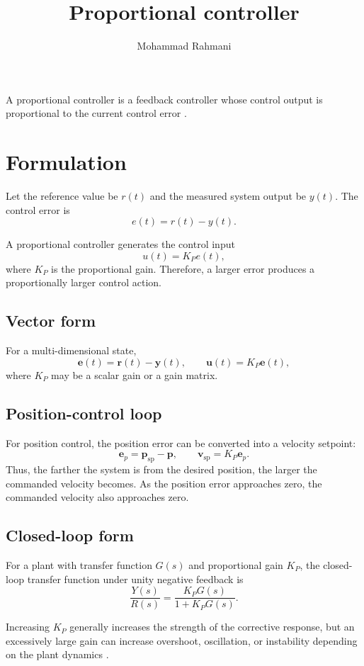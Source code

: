 \documentclass[a4paper]{article}
\title{Proportional controller}
\date{}
\author{Mohammad Rahmani}
\begin{document}
   \maketitle

   A proportional controller is a feedback controller whose control output is proportional to the current control error \cite{astrom-2008-feedback-systems-an-introduction-for-scientists-and-engineers}.

   \section{Formulation}
      Let the reference value be $r(t)$ and the measured system output be $y(t)$. The control error is
      \[
         e(t)=r(t)-y(t).
      \]

      A proportional controller generates the control input
      \[
         u(t)=K_P e(t),
      \]
      where $K_P$ is the proportional gain. Therefore, a larger error produces a proportionally larger control action.

   \subsection{Vector form}
      For a multi-dimensional state,
      \[
         \mathbf{e}(t)=\mathbf{r}(t)-\mathbf{y}(t),
         \qquad
         \mathbf{u}(t)=K_P\mathbf{e}(t),
      \]
      where $K_P$ may be a scalar gain or a gain matrix.

   \subsection{Position-control loop}
      For position control, the position error can be converted into a velocity setpoint:
      \[
         \mathbf{e}_p
         =
         \mathbf{p}_{\mathrm{sp}}
         -
         \mathbf{p},
         \qquad
         \mathbf{v}_{\mathrm{sp}}
         =
         K_P\mathbf{e}_p.
      \]
      Thus, the farther the system is from the desired position, the larger the commanded velocity becomes. As the position error approaches zero, the commanded velocity also approaches zero.

   \subsection{Closed-loop form}
      For a plant with transfer function $G(s)$ and proportional gain $K_P$, the closed-loop transfer function under unity negative feedback is
      \[
         \frac{Y(s)}{R(s)}
         =
         \frac{K_P G(s)}
              {1+K_P G(s)}.
      \]

      Increasing $K_P$ generally increases the strength of the corrective response, but an excessively large gain can increase overshoot, oscillation, or instability depending on the plant dynamics \cite{astrom-2008-feedback-systems-an-introduction-for-scientists-and-engineers}.

   
   
\end{document}
